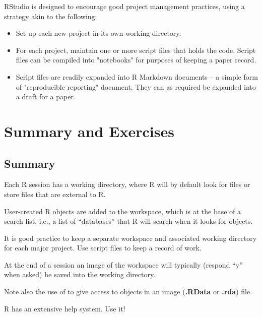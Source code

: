 RStudio is designed to encourage good project management practices,
using a strategy akin to the following:
\begin{itemize}
\item[] Set up each new project in its own working directory.
\item[] For each project, maintain one or more script files that
holds the code.  Script files can be compiled into "notebooks"
for purposes of keeping a paper record.
\item[] Script files are readily expanded into R Markdown documents
-- a simple form of "reproducible reporting" document.  They can
as required be expanded into a draft for a paper.
\end{itemize}


\section{Summary and Exercises}

\subsection{Summary}
\begin{itemizz}
\item[] Each R session has a working directory, where R will by
  default look for files or store files that are external to R.
\item[]
User-created R objects are added to the workspace, which is
at the base of a search list, i.e., a list of ``databases'' that R
will search when it looks for objects.
\item[] It is good practice to keep a separate workspace and
  associated working directory for each major project.  Use script
  files to keep a record of work.  
\item[] At the end of a session an image of the workspace will
  typically (respond ``y'' when asked) be saved into the working
  directory.
\item[] Note also the use of  to give access to objects
  in an image (\textbf{.RData} or \textbf{.rda})
  file.
\item[] R has an extensive help system.  Use it!
\end{itemizz}

